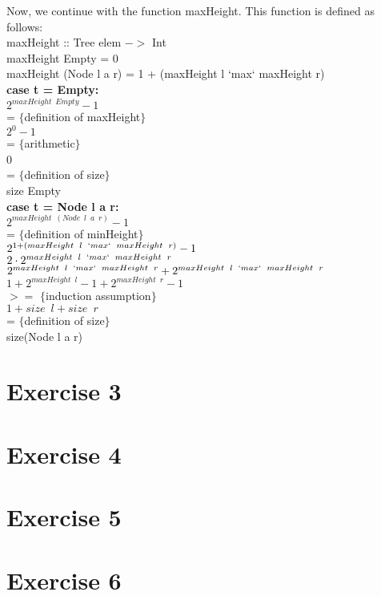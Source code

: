 \documentclass{article}
\begin{document}
\begin{enumerate}
  Now, we continue with the function maxHeight. This function is defined as follows:\\
  maxHeight :: Tree elem $->$ Int \\
  maxHeight Empty = 0 \\
  maxHeight (Node l a r) = 1 + (maxHeight l `max` maxHeight r) \\
  \newline
  \textbf{case t = Empty:} \\
  $2^{maxHeight \enspace Empty} - 1$ \\
  = $\{$definition of maxHeight$\}$ \\
  $2^0 - 1$ \\
  = $\{$arithmetic$\}$ \\
  0 \\
  = $\{$definition of size$\}$ \\
  size Empty \\
  \newline
  \textbf{case t = Node l a r:} \\
  $2^{maxHeight \enspace (Node \enspace l \enspace a \enspace r)} - 1$ \\
  = $\{$definition of minHeight$\}$ \\
  $2^{1 + (maxHeight \enspace l \enspace `max` \enspace maxHeight \enspace r)} - 1$ \\
  $2 \cdot 2^{maxHeight \enspace l \enspace `max` \enspace maxHeight \enspace r}$ \\
  $2^{maxHeight \enspace l \enspace `max` \enspace maxHeight \enspace r} + 2^{maxHeight \enspace l \enspace `max` \enspace maxHeight \enspace r}$ \\
  $1 + 2^{maxHeight \enspace l} - 1 + 2^{maxHeight \enspace r} - 1$ \\
  $>=$ $\{$induction assumption$\}$ \\
  $1 + size \enspace l + size \enspace r$ \\
  = $\{$definition of size$\}$ \\
  size(Node l a r)
\end{enumerate}

\section*{Exercise 3}
\section*{Exercise 4}
%
%
%
%
\section*{Exercise 5}
\section*{Exercise 6}
\end{document}

